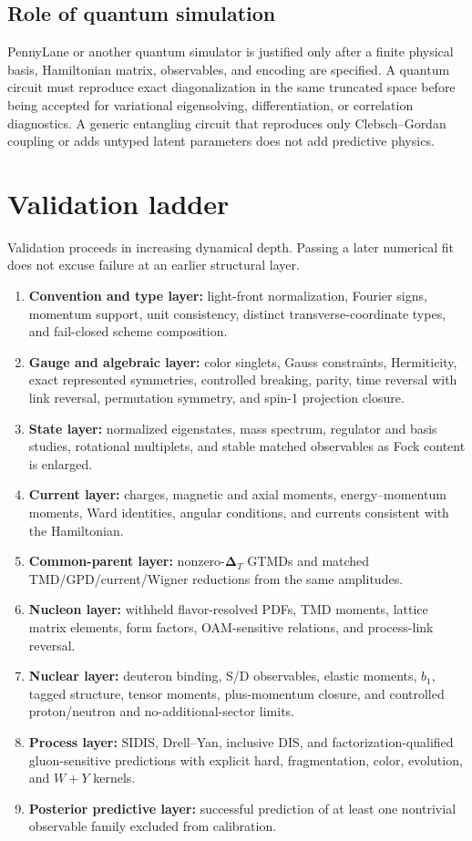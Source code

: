 \documentclass[11pt]{article}
\newcommand{\DT}{\bm{\Delta}_{T}}
\begin{document}
\subsection{Role of quantum simulation}

PennyLane or another quantum simulator is justified only after a finite
physical basis, Hamiltonian matrix, observables, and encoding are specified.
A quantum circuit must reproduce exact diagonalization in the same truncated
space before being accepted for variational eigensolving, differentiation, or
correlation diagnostics.  A generic entangling circuit that reproduces only
Clebsch--Gordan coupling or adds untyped latent parameters does not add
predictive physics.

\section{Validation ladder}
\label{sec:validation}

Validation proceeds in increasing dynamical depth.  Passing a later numerical
fit does not excuse failure at an earlier structural layer.

\begin{enumerate}
\item \textbf{Convention and type layer:} light-front normalization, Fourier
signs, momentum support, unit consistency, distinct transverse-coordinate
types, and fail-closed scheme composition.
\item \textbf{Gauge and algebraic layer:} color singlets, Gauss constraints,
Hermiticity, exact represented symmetries, controlled breaking, parity,
time reversal with link reversal, permutation symmetry, and spin-1 projection
closure.
\item \textbf{State layer:} normalized eigenstates, mass spectrum, regulator
and basis studies, rotational multiplets, and stable matched observables as
Fock content is enlarged.
\item \textbf{Current layer:} charges, magnetic and axial moments,
energy--momentum moments, Ward identities, angular conditions, and currents
consistent with the Hamiltonian.
\item \textbf{Common-parent layer:} nonzero-\(\DT\) GTMDs and matched
TMD/GPD/current/Wigner reductions from the same amplitudes.
\item \textbf{Nucleon layer:} withheld flavor-resolved PDFs, TMD moments,
lattice matrix elements, form factors, OAM-sensitive relations, and
process-link reversal.
\item \textbf{Nuclear layer:} deuteron binding, S/D observables, elastic
moments, \(b_1\), tagged structure, tensor moments, plus-momentum closure,
and controlled proton/neutron and no-additional-sector limits.
\item \textbf{Process layer:} SIDIS, Drell--Yan, inclusive DIS, and
factorization-qualified gluon-sensitive predictions with explicit hard,
fragmentation, color, evolution, and \(W+Y\) kernels.
\item \textbf{Posterior predictive layer:} successful prediction of at least
one nontrivial observable family excluded from calibration.
\end{enumerate}
\end{document}
